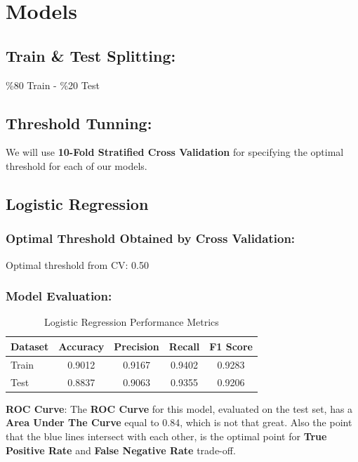 \documentclass[a4paper,12pt]{article}
\begin{document}
\section{Models}

\subsection{Train \& Test Splitting:}
\%80 Train - \%20 Test 

\subsection{Threshold Tunning:}
We will use \textbf{10-Fold Stratified Cross Validation} for specifying the optimal threshold for each of our models. 

\subsection{Logistic Regression}
\subsubsection{Optimal Threshold Obtained by Cross Validation:}
Optimal threshold from CV: 0.50

\subsubsection{Model Evaluation:}

\begin{table}[H]
\centering
\caption{Logistic Regression Performance Metrics}
\begin{tabular}{lcccc}
\toprule
\textbf{Dataset} & \textbf{Accuracy} & \textbf{Precision} & \textbf{Recall} & \textbf{F1 Score} \\
\midrule
Train & 0.9012 & 0.9167 & 0.9402 & 0.9283 \\
Test  & 0.8837 & 0.9063 & 0.9355 & 0.9206 \\
\bottomrule
\end{tabular}
\end{table}

\noindent\textbf{ROC Curve}:
The \textbf{ROC Curve} for this model, evaluated on the test set, has a \textbf{Area Under The Curve} equal to 0.84, which is not that great. Also the point that the blue lines intersect
with each other, is the optimal point for \textbf{True Positive Rate} and \textbf{False Negative Rate} trade-off. \\
\end{document}
